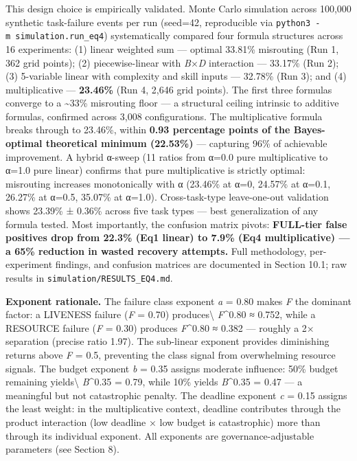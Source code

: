 \documentclass[
  10pt,
]{article}
\begin{document}
This design choice is empirically validated. Monte Carlo simulation
across 100,000 synthetic task-failure events per run (seed=42,
reproducible via \texttt{python3\ -m\ simulation.run\_eq4})
systematically compared four formula structures across 16 experiments:
(1) linear weighted sum --- optimal 33.81\% misrouting (Run 1, 362 grid
points); (2) piecewise-linear with \emph{B}×\emph{D} interaction ---
33.17\% (Run 2); (3) 5-variable linear with complexity and skill inputs
--- 32.78\% (Run 3); and (4) multiplicative --- \textbf{23.46\%} (Run 4,
2,646 grid points). The first three formulas converge to a
\textasciitilde33\% misrouting floor --- a structural ceiling intrinsic
to additive formulas, confirmed across 3,008 configurations. The
multiplicative formula breaks through to 23.46\%, within \textbf{0.93
percentage points of the Bayes-optimal theoretical minimum (22.53\%)}
--- capturing 96\% of achievable improvement. A hybrid α-sweep (11
ratios from α=0.0 pure multiplicative to α=1.0 pure linear) confirms
that pure multiplicative is strictly optimal: misrouting increases
monotonically with α (23.46\% at α=0, 24.57\% at α=0.1, 26.27\% at
α=0.5, 35.07\% at α=1.0). Cross-task-type leave-one-out validation shows
23.39\% ± 0.36\% across five task types --- best generalization of any
formula tested. Most importantly, the confusion matrix pivots:
\textbf{FULL-tier false positives drop from 22.3\% (Eq1 linear) to 7.9\%
(Eq4 multiplicative) --- a 65\% reduction in wasted recovery attempts.}
Full methodology, per-experiment findings, and confusion matrices are
documented in Section 10.1; raw results in
\texttt{simulation/RESULTS\_EQ4.md}.

\textbf{Exponent rationale.} The failure class exponent \emph{a} = 0.80
makes \emph{F} the dominant factor: a LIVENESS failure (\emph{F} = 0.70)
produces\textbackslash{} \emph{F}\^{}0.80 ≈ 0.752, while a RESOURCE
failure (\emph{F} = 0.30) produces \emph{F}\^{}0.80 ≈ 0.382 --- roughly
a 2× separation (precise ratio 1.97). The sub-linear exponent provides
diminishing returns above \emph{F} = 0.5, preventing the class signal
from overwhelming resource signals. The budget exponent \emph{b} = 0.35
assigns moderate influence: 50\% budget remaining yields\textbackslash{}
\emph{B}\^{}0.35 = 0.79, while 10\% yields \emph{B}\^{}0.35 = 0.47 --- a
meaningful but not catastrophic penalty. The deadline exponent \emph{c}
= 0.15 assigns the least weight: in the multiplicative context, deadline
contributes through the product interaction (low deadline × low budget
is catastrophic) more than through its individual exponent. All
exponents are governance-adjustable parameters (see Section 8).
\end{document}
